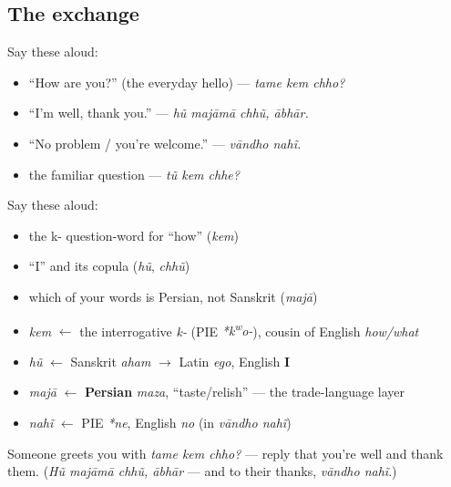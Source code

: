 \subsection*{The exchange}
Say these aloud:

\begin{itemize}
\raggedright
  \item \textquotedblleft{}How are you?\textquotedblright{} (the everyday hello) — \emph{tame kem chho?}
  \item \textquotedblleft{}I'm well, thank you.\textquotedblright{} — \emph{hũ majāmā chhũ, ābhār.}
  \item \textquotedblleft{}No problem / you're welcome.\textquotedblright{} — \emph{vāndho nahĩ.}
  \item the familiar question — \emph{tũ kem chhe?}
\end{itemize}

\begin{cousinweb}
Say these aloud:

\begin{itemize}
\raggedright
  \item the k- question-word for \textquotedblleft{}how\textquotedblright{} (\emph{kem})
  \item \textquotedblleft{}I\textquotedblright{} and its copula (\emph{hũ}, \emph{chhũ})
  \item which of your words is Persian, not Sanskrit (\emph{majā})
\end{itemize}
\end{cousinweb}

\begin{grammarlens}[title={What you've built — roots you now carry}]
\begin{itemize}
\raggedright
  \item \emph{kem} $\leftarrow$ the interrogative \emph{k-} (PIE \emph{*k\textsuperscript{w}o-}), cousin of English \emph{how/what}
  \item \emph{hũ} $\leftarrow$ Sanskrit \emph{aham} $\to$ Latin \emph{ego}, English \textbf{I}
  \item \emph{majā} $\leftarrow$ \textbf{Persian} \emph{maza}, \textquotedblleft{}taste/relish\textquotedblright{} — the trade-language layer
  \item \emph{nahĩ} $\leftarrow$ PIE \emph{*ne}, English \emph{no} (in \emph{vāndho nahĩ})
\end{itemize}
\end{grammarlens}

\begin{tcolorbox}[breakable,colback=teal!4,colframe=teal!35!black,title={Before you move on}]
Someone greets you with \emph{tame kem chho?} — reply that you're well and thank them. (\emph{Hũ majāmā chhũ, ābhār} — and to their thanks, \emph{vāndho nahĩ}.)
\end{tcolorbox}
